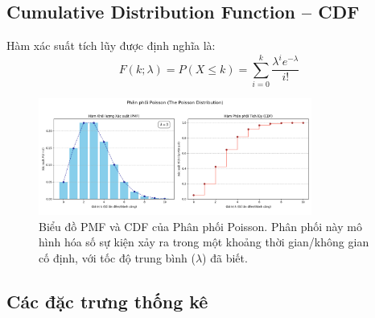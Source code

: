 \subsection{Cumulative Distribution Function – CDF}

Hàm xác suất tích lũy được định nghĩa là:
\[
F(k; \lambda) = P(X \le k) = \sum_{i=0}^k \frac{\lambda^i e^{-\lambda}}{i!}
\]

\begin{figure}[h!]
    \centering
    \includegraphics[width=0.8\textwidth]{images/Poisson_PMF_and_CDF.png}
    \caption{Biểu đồ PMF và CDF của Phân phối Poisson. Phân phối này mô hình hóa số sự kiện xảy ra trong một khoảng thời gian/không gian cố định, với tốc độ trung bình ($\lambda$) đã biết.}
    \label{fig:poisson_dist}
\end{figure}
\subsection{Các đặc trưng thống kê}

